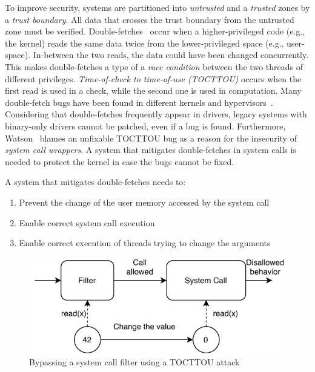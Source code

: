 To improve security, systems are partitioned into \emph{untrusted} and a
\emph{trusted} zones by a \emph{trust boundary}. All data that crosses the trust
boundary from the untrusted zone must be verified.
Double-fetches~\cite{serna08doublefetch, twizsgrakky07ring0, wilhelm2016xenpwn,
wang2018survey} occur when a higher-privileged code (e.g., the kernel) reads the
same data twice from the lower-privileged space (e.g., user-space). In-between
the two reads, the data could have been changed concurrently. This makes
double-fetches a type of a \emph{race condition} between the two threads of
different privileges. \emph{Time-of-check to time-of-use (TOCTTOU)} occurs when
the first read is used in a check, while the second one is used in computation.
Many double-fetch bugs have been found in different kernels and
hypervisors~\cite{cve201812633, cve202012652, cve20131332, cve201920610,
cve20158550, cve201610439, cve201610435, cve201610433, cve20195519,
cve20168438}. Considering that double-fetches frequently appear in drivers,
legacy systems with binary-only drivers cannot be patched, even if a bug is
found. Furthermore, Watson~\cite{watson2007} blames an unfixable TOCTTOU bug as
a reason for the insecurity of \emph{system call wrappers}. A system that
mitigates double-fetches in system calls is needed to protect the kernel in case
the bugs cannot be fixed.


A system that mitigates double-fetches needs to:
\begin{enumerate}
  \item Prevent the change of the user memory accessed by the system call
  \item Enable correct system call execution
  \item Enable correct execution of threads trying to change the arguments
\end{enumerate}


\begin{figure}[]
  \centering
  \includegraphics[width=.85\linewidth]{img/tocttou.pdf}
  \caption{Bypassing a system call filter using a TOCTTOU attack}
  \label{fig:tocttou}
\end{figure}

